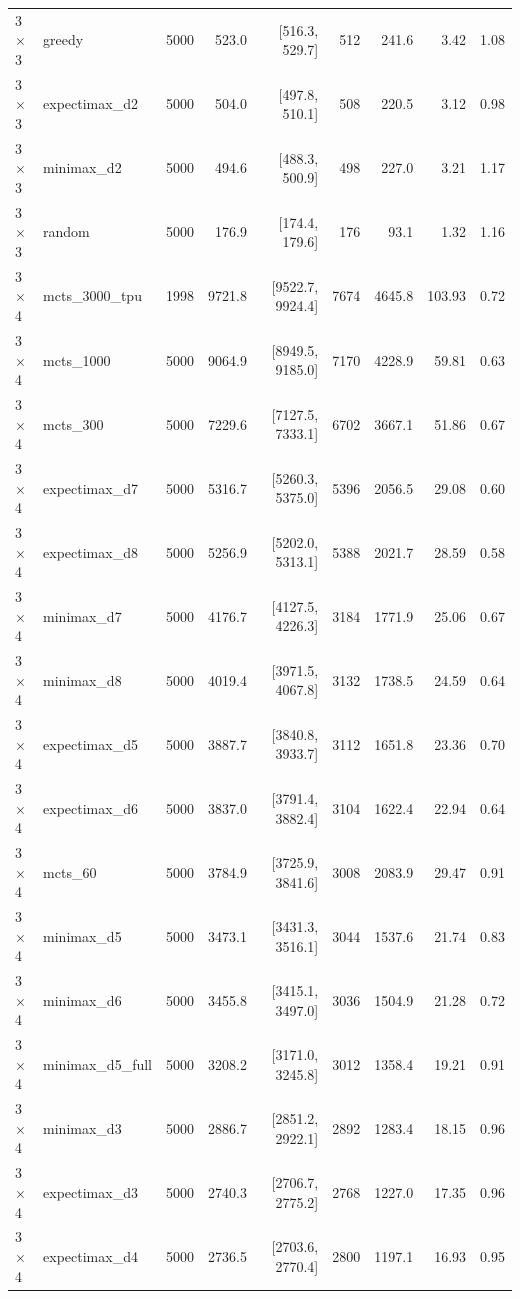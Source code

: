 {\begin{longtable}{llrrrrrrr}
3$\times$3 & greedy & 5000 & 523.0 & [516.3, 529.7] & 512 & 241.6 & 3.42 & 1.08 \\
3$\times$3 & expectimax\_d2 & 5000 & 504.0 & [497.8, 510.1] & 508 & 220.5 & 3.12 & 0.98 \\
3$\times$3 & minimax\_d2 & 5000 & 494.6 & [488.3, 500.9] & 498 & 227.0 & 3.21 & 1.17 \\
3$\times$3 & random & 5000 & 176.9 & [174.4, 179.6] & 176 & 93.1 & 1.32 & 1.16 \\
\midrule
3$\times$4 & mcts\_3000\_tpu & 1998 & 9721.8 & [9522.7, 9924.4] & 7674 & 4645.8 & 103.93 & 0.72 \\
3$\times$4 & mcts\_1000 & 5000 & 9064.9 & [8949.5, 9185.0] & 7170 & 4228.9 & 59.81 & 0.63 \\
3$\times$4 & mcts\_300 & 5000 & 7229.6 & [7127.5, 7333.1] & 6702 & 3667.1 & 51.86 & 0.67 \\
3$\times$4 & expectimax\_d7 & 5000 & 5316.7 & [5260.3, 5375.0] & 5396 & 2056.5 & 29.08 & 0.60 \\
3$\times$4 & expectimax\_d8 & 5000 & 5256.9 & [5202.0, 5313.1] & 5388 & 2021.7 & 28.59 & 0.58 \\
3$\times$4 & minimax\_d7 & 5000 & 4176.7 & [4127.5, 4226.3] & 3184 & 1771.9 & 25.06 & 0.67 \\
3$\times$4 & minimax\_d8 & 5000 & 4019.4 & [3971.5, 4067.8] & 3132 & 1738.5 & 24.59 & 0.64 \\
3$\times$4 & expectimax\_d5 & 5000 & 3887.7 & [3840.8, 3933.7] & 3112 & 1651.8 & 23.36 & 0.70 \\
3$\times$4 & expectimax\_d6 & 5000 & 3837.0 & [3791.4, 3882.4] & 3104 & 1622.4 & 22.94 & 0.64 \\
3$\times$4 & mcts\_60 & 5000 & 3784.9 & [3725.9, 3841.6] & 3008 & 2083.9 & 29.47 & 0.91 \\
3$\times$4 & minimax\_d5 & 5000 & 3473.1 & [3431.3, 3516.1] & 3044 & 1537.6 & 21.74 & 0.83 \\
3$\times$4 & minimax\_d6 & 5000 & 3455.8 & [3415.1, 3497.0] & 3036 & 1504.9 & 21.28 & 0.72 \\
3$\times$4 & minimax\_d5\_full & 5000 & 3208.2 & [3171.0, 3245.8] & 3012 & 1358.4 & 19.21 & 0.91 \\
3$\times$4 & minimax\_d3 & 5000 & 2886.7 & [2851.2, 2922.1] & 2892 & 1283.4 & 18.15 & 0.96 \\
3$\times$4 & expectimax\_d3 & 5000 & 2740.3 & [2706.7, 2775.2] & 2768 & 1227.0 & 17.35 & 0.96 \\
3$\times$4 & expectimax\_d4 & 5000 & 2736.5 & [2703.6, 2770.4] & 2800 & 1197.1 & 16.93 & 0.95 \\

\end{longtable}}
